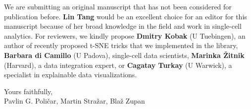 \documentclass[11pt]{article}
\begin{document}
\begin{flushleft}
We are submitting an original manuscript that has not been considered for publication before. {\bf Lin Tang} would be an excellent choice for an editor for this manuscript because of her broad knowledge in the field and work in single-cell analytics. For reviewers, we kindly propose {\bf Dmitry Kobak} (U Tuebingen), an author of recently proposed t-SNE tricks that we implemented in the library, {\bf Barbara di Camillo} (U Padova), single-cell data scientists, {\bf Marinka Žitnik} (Harvard), a data integration expert, or {\bf Cagatay Turkay} (U Warwick), a specialist in explainable data visualizations. 

Yours faithfully, \\
Pavlin G. Poličar, Martin Stražar, Blaž Zupan
\end{flushleft}
\end{document}
